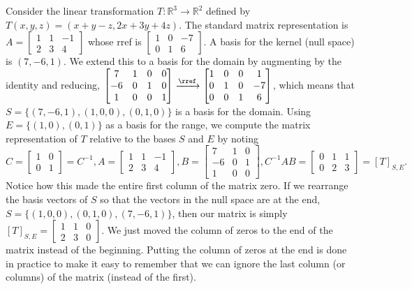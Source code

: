 \begin{example}\label{ltbasis1}
Consider the linear transformation $T\colon{\mathbb{R}}^3\to {\mathbb{R}}^2$ defined by $T(x,y,z)=(x+y-z,2x+3y+4z)$. The standard matrix representation is 
$
A=
\begin{bmatrix}
 1 & 1 & -1 \\
 2 & 3 & 4
\end{bmatrix}
$
whose rref is
$
\begin{bmatrix}
 1 & 0 & -7 \\
 0 & 1 & 6
\end{bmatrix}
$. A basis for the kernel (null space) is $(7,-6,1)$. We extend this to a basis for the domain by augmenting by the identity and reducing, 
$
\begin{bmatrix}
 7 & 1 & 0 & 0 \\
 -6 & 0 & 1 & 0 \\
 1 & 0 & 0 & 1
\end{bmatrix}
\xrightarrow{\rref}
\begin{bmatrix}
 1 & 0 & 0 & 1 \\
 0 & 1 & 0 & -7 \\
 0 & 0 & 1 & 6
\end{bmatrix}
$, which means that $S=\{(7,-6,1),(1,0,0),(0,1,0)\}$ is a basis for the domain. Using $E=\{(1,0),(0,1)\}$ as a basis for the range, we compute the matrix representation of $T$ relative to the bases $S$ and $E$ by noting 
$$C=
\begin{bmatrix}
1 & 0\\
0 & 1
\end{bmatrix}=C^{-1},
A=
\begin{bmatrix}
 1 & 1 & -1 \\
 2 & 3 & 4
\end{bmatrix}, 
B=
\begin{bmatrix}
 7 & 1 & 0 \\
 -6 & 0 & 1 \\
 1 & 0 & 0
\end{bmatrix},
C^{-1}AB= 
\begin{bmatrix}
 0 & 1 & 1 \\
 0 & 2 & 3
\end{bmatrix} = [T]_{S,E}.$$ 
Notice how this made the entire first column of the matrix zero. If we rearrange the basis vectors of $S$ so that the vectors in the null space are at the end, $S=\{(1,0,0),(0,1,0),(7,-6,1)\}$, then our matrix is simply $[T]_{S,E} = \begin{bmatrix}
 1 & 1 &0\\
 2 & 3 &0
\end{bmatrix}$. We just moved the column of zeros to the end of the matrix instead of the beginning. Putting the column of zeros at the end is done in practice to make it easy to remember that we can ignore the last column (or columns) of the matrix (instead of the first).

\end{example}

